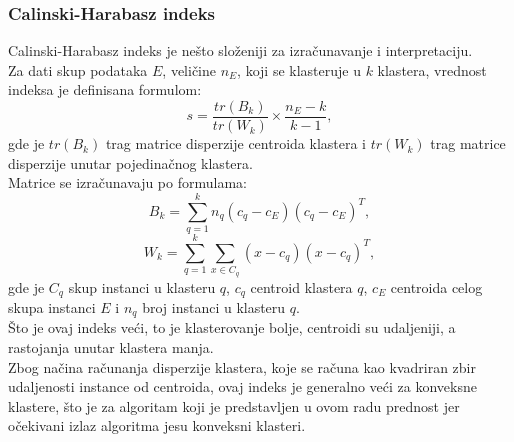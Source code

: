 \documentclass[a4paper,serbian]{symopissr}
\begin{document}
\subsubsection{Calinski-Harabasz indeks}
\label{sec:ch}
Calinski-Harabasz indeks \cite{ch_score} je nešto složeniji za izračunavanje i interpretaciju.\\
Za dati skup podataka $E$, veličine $n_E$, koji se klasteruje u $k$ klastera, vrednost indeksa je definisana formulom:
%
\begin{equation}
s = \frac{tr(B_k)}{tr(W_k)} \times \frac{n_E - k}{k - 1},
\end{equation}
%
gde je $tr(B_k)$ trag matrice disperzije centroida klastera i $tr(W_k)$ trag matrice disperzije unutar pojedinačnog klastera.\\

Matrice se izračunavaju po formulama:
%
\begin{equation}
	B_k = \sum_{q=1}^{k} n_q(c_q - c_E)(c_q - c_E)^T,
\end{equation}
%
\begin{equation} 
	W_k = \sum_{q=1}^{k}\sum_{x \in C_q}(x - c_q)(x - c_q)^T,
\end{equation}
%
gde je $C_q$ skup instanci u klasteru $q$, $c_q$ centroid klastera $q$, $c_E$  centroida celog skupa instanci $E$ i $n_q$ broj instanci u klasteru $q$.\\

Što je ovaj indeks veći, to je klasterovanje bolje, centroidi su udaljeniji, a rastojanja unutar klastera manja.\\
Zbog načina računanja disperzije klastera, koje se računa kao kvadriran zbir udaljenosti instance od centroida, ovaj indeks je generalno veći za konveksne klastere, što je za algoritam koji je predstavljen u ovom radu prednost jer očekivani izlaz algoritma jesu konveksni klasteri.
\end{document}
